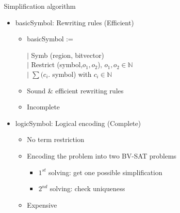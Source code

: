\begin{frame}{Simplification algorithm}
        \begin{itemize}
        \item basicSymbol: Rewriting rules (Efficient)~
        \begin{itemize}
        \item basicSymbol :=\\
        \begin{scriptsize}
        \hspace*{1cm}$\mid$ Symb (region, bitvector)\\
        \hspace*{1cm}$\mid$ Restrict (symbol,$ o_1, o_2$), $o_1, o_2 \in \mathbb{N}$\\
        \hspace*{1cm}$\mid$ $\sum (c_i .$ symbol) with $c_i \in \mathbb{N}$\\
        \end{scriptsize}
        \item Sound \& efficient rewriting rules
        \item Incomplete
        \end{itemize}
        \bigskip
        \item logicSymbol: Logical encoding (Complete)~
        \begin{itemize}
        \item No term restriction
        \item Encoding the problem into two BV-SAT problems
        \begin{itemize}
        \item $1^{st}$ solving: get one possible simplification
        \item $2^{nd}$ solving: check uniqueness
        \end{itemize}
        \item Expensive
        \end{itemize}
        \end{itemize}
\end{frame}


